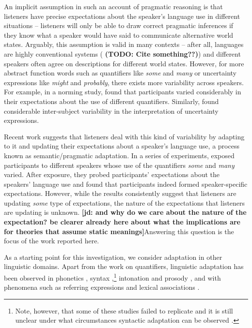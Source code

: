 \documentclass[lucida,biblatex]{sp} %
\newcommand{\jd}[1]{\textcolor{PinkyPurple}{\textbf{[jd: #1]}}}
\newcommand{\todo}[1]{}
\renewcommand{\todo}[1]{{\bf \color{red} (TODO: {#1})}}
\begin{document}
An implicit assumption in such an account of pragmatic reasoning is that listeners have precise expectations about the speaker's language use in different situations -- listeners will only be able to draw correct pragmatic inferences if they know what a speaker would have said to communicate alternative world states. Arguably, this assumption is valid in many contexts -- after all, languages are highly conventional systems (\todo{Cite something??}) and different speakers  often agree on descriptions for different world states. However, for more abstract function words such as quantifiers like \textit{some} and \textit{many} or uncertainty expressions like \textit{might} and \textit{probably}, there exists more variability across speakers. For example, in a norming study, \citet{Yildirim2016} found that participants varied considerably in their expectations about the use of different quantifiers. Similarly, \citet{Wallsten1986} found considerable inter-subject variability in the interpretation of uncertainty expressions. 

Recent work suggests that listeners deal with this kind of variability by adapting to it and updating their expectations about a speaker's language use, a process known as semantic/pragmatic adaptation. In a series of experiments, \citet{Yildirim2016} exposed participants to different speakers whose use of the quantifiers \textit{some} and \textit{many} varied. After exposure, they probed participants' expectations about the speakers' language use and found that participants indeed formed speaker-specific expectations. However, while the results consistently suggest that listeners are updating \textit{some} type of expectations, the nature of the expectations that listeners are updating is unknown. \jd{and why do we care about the nature of the expectation? be clearer already here about what the implications are for theories that assume static meanings}Answering this question is the focus of the work reported here.

As a starting point for this investigation, we consider adaptation in other linguistic domains. Apart from the work on quantifiers, linguistic adaptation has been observed in  phonetics \citep[e.g.,][]{Goldinger1998,Norris2003,Kraljic2005,Kraljic2007,Babel2012,Kleinschmidt2015}, 
syntax \citep{Kamide2012,Fine2013,Fine2016,Myslin2016,Kroczek2017},\footnote{Note, 
however, that some of these studies failed to replicate and it is still unclear under what 
circumstances syntactic adaptation can be observed \citep[see ][]{Liu2017,HarringtonStack2018}.} intonation and prosody \citep{Kurumada2012,Roettger2019}, and with phenomena such as referring expressions
\citep{Clark1986,Brennan1996,Metzing2003,Horton2005,Brennan2009} and lexical associations \citep{DelaneyBusch2019}. 
\end{document}

